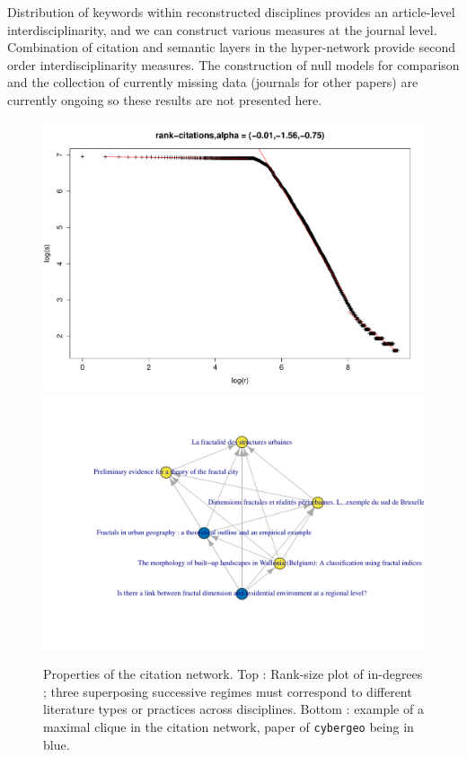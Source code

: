Distribution of keywords within reconstructed disciplines provides an article-level interdisciplinarity, and we can construct various measures at the journal level. Combination of citation and semantic layers in the hyper-network provide second order interdisciplinarity measures. The construction of null models for comparison and the collection of currently missing data (journals for other papers) are currently ongoing so these results are not presented here.





\begin{figure}
\includegraphics[width=\textwidth]{figures/rank-size-all}
\includegraphics[width=\textwidth]{figures/cybclic_2cyb_13761}
\caption[Properties of the citation network]{Properties of the citation network. Top : Rank-size plot of in-degrees ; three superposing successive regimes must correspond to different literature types or practices across disciplines. Bottom : example of a maximal clique in the citation network, paper of \texttt{cybergeo} being in blue.}
\label{fig:quantepistemo:citnw}
\end{figure}


